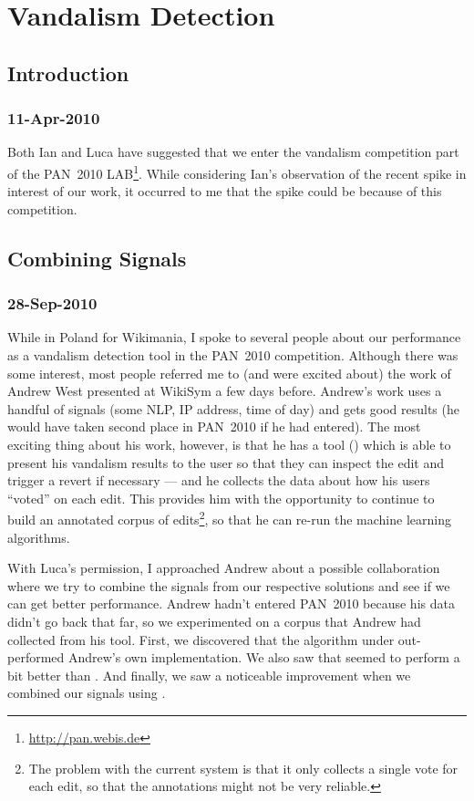 \chapter{Vandalism Detection}

\section{Introduction}

\subsection{11-Apr-2010}

Both Ian and Luca have suggested that we enter the vandalism competition
part of the PAN~2010 LAB\footnote{\url{http://pan.webis.de}}.
While considering Ian's observation of the recent spike in
interest of our work, it occurred to me that the spike could
be because of this competition.

\section{Combining Signals}

\subsection{28-Sep-2010}

While in Poland for Wikimania, I spoke to several people about our
performance as a vandalism detection tool in the PAN~2010 competition.
Although there was some interest, most people referred me to (and were
excited about) the work of Andrew West presented at WikiSym a few days before.
Andrew's work uses a handful of signals (\eg some NLP, IP address, time of
day) and gets good results (he would have taken second place in
PAN~2010 if he had entered).
The most exciting thing about his work, however, is that he has a tool
() which is able to present his vandalism results to
the user so that they can inspect the edit and trigger a revert if
necessary --- and he collects the data about how his users ``voted''
on each edit.
This provides him with the opportunity to continue to build an
annotated corpus of edits\footnote{The problem with the current system
is that it only collects a single vote for each edit, so that the
annotations might not be very reliable.}, so that he can re-run the
machine learning algorithms.

With Luca's permission, I approached Andrew about a possible
collaboration where we try to combine the signals from our respective
solutions and see if we can get better performance.
Andrew hadn't entered PAN~2010 because his data didn't go back that
far, so we experimented on a corpus that Andrew had collected from 
his tool.
First, we discovered that the  algorithm under
 out-performed Andrew's own 
implementation.
We also saw that \wikitrust seemed to perform a bit better than
.
And finally, we saw a noticeable improvement when we combined our
signals using .

